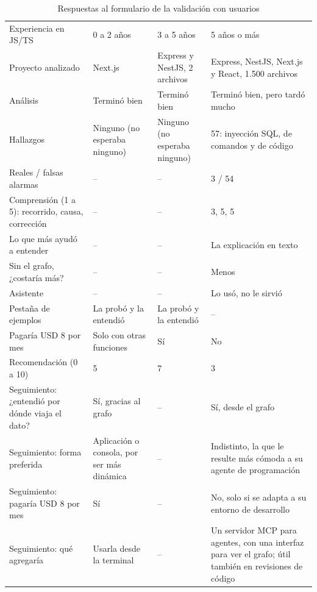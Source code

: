 \begin{table}[H]
    \centering
    \caption{Respuestas al formulario de la validación con usuarios}
    \label{tab:h3-resultados}
    \footnotesize
    \begin{tabularx}{\textwidth}{>{\raggedright\arraybackslash}p{} L L L}
        \toprule
         &  &  &  \\
        \midrule
        Experiencia en JS/TS & 0 a 2 años & 3 a 5 años & 5 años o más \\
        Proyecto analizado & Next.js & Express y NestJS, 2 archivos & Express, NestJS, Next.js y React, 1.500 archivos \\
        Análisis & Terminó bien & Terminó bien & Terminó bien, pero tardó mucho \\
        Hallazgos & Ninguno (no esperaba ninguno) & Ninguno (no esperaba ninguno) & 57: inyección SQL, de comandos y de código \\
        Reales / falsas alarmas & -- & -- & 3 / 54 \\
        Comprensión (1 a 5): recorrido, causa, corrección & -- & -- & 3, 5, 5 \\
        Lo que más ayudó a entender & -- & -- & La explicación en texto \\
        Sin el grafo, ¿costaría más? & -- & -- & Menos \\
        Asistente & -- & -- & Lo usó, no le sirvió \\
        Pestaña de ejemplos & La probó y la entendió & La probó y la entendió & -- \\
        Pagaría USD 8 por mes & Solo con otras funciones & Sí & No \\
        Recomendación (0 a 10) & 5 & 7 & 3 \\
        \midrule
        Seguimiento: ¿entendió por dónde viaja el dato? & Sí, gracias al grafo & -- & Sí, desde el grafo \\
        Seguimiento: forma preferida & Aplicación o consola, por ser más dinámica & -- & Indistinto, la que le resulte más cómoda a su agente de programación \\
        Seguimiento: pagaría USD 8 por mes & Sí & -- & No, solo si se adapta a su entorno de desarrollo \\
        Seguimiento: qué agregaría & Usarla desde la terminal & -- & Un servidor MCP para agentes, con una interfaz para ver el grafo; útil también en revisiones de código \\
        \bottomrule
    \end{tabularx}
\end{table}

